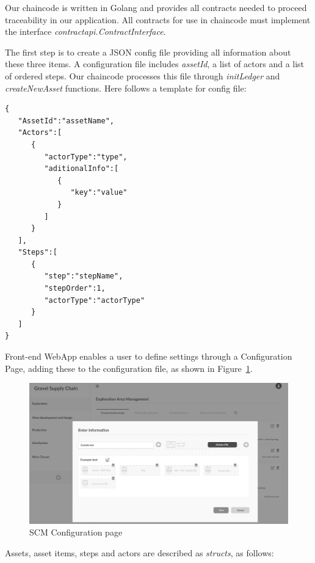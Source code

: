 Our chaincode is written in Golang and provides all contracts needed to proceed traceability in our application. All contracts for use in chaincode must implement the interface \textit{contractapi.ContractInterface}. 

The first step is to create a JSON config file providing all information about these three items. A configuration file includes \textit{assetId}, a list of actors and a list of ordered steps. Our chaincode processes this file through  \textit{initLedger} and \textit{createNewAsset} functions. Here follows a template for config file:  

\begin{lstlisting}
{
   "AssetId":"assetName",
   "Actors":[
      {
         "actorType":"type",
         "aditionalInfo":[
            {
               "key":"value"
            }
         ]
      }
   ],
   "Steps":[
      {
         "step":"stepName",
         "stepOrder":1,
         "actorType":"actorType"
      }
   ]
}
\end{lstlisting}

Front-end WebApp enables a user to define settings through a Configuration Page, adding these to the configuration file, as shown in Figure~\ref{fig:frontend02}.

\begin{figure}[ht]
\begin{center}
  \includegraphics[scale=0.265]{images/frontend02.png}
\caption{SCM Configuration page}
\label{fig:frontend02}
\end{center}
\end{figure}

Assets, asset items, steps and actors are described as \textit{structs}, as follows:

